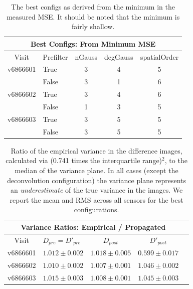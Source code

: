 \documentclass[prd, nofootinbib, floatfix, 11pt,tightenlines,times]{article}
\begin{document}
\clearpage

\begin{table}
\centering
\begin{tabular}{clccc}
\hline
\multicolumn{5}{|c|}{Best Configs: From Minimum MSE} \\
\hline
Visit    & Prefilter & nGauss & degGauss & spatialOrder \\
\hline
v6866601 & True      & 3      & 4        & 5 \\
         & False     & 3      & 1        & 6 \\
v6866602 & True      & 3      & 4        & 6 \\
         & False     & 1      & 3        & 5 \\
v6866603 & True      & 3      & 5        & 5 \\
         & False     & 3      & 5        & 5 \\
\end{tabular}
\caption{The best configs as derived from the minimum in the measured MSE.  It should 
be noted that the minimum is fairly shallow.
\label{tab-bestconfig_MSE}}
\end{table}

\clearpage

\begin{table}
\centering
\begin{tabular}{clccc}
\hline
\multicolumn{4}{|c|}{Variance Ratios: Empirical / Propagated} \\
\hline
Visit    & $D_{pre} = D'_{pre}$ & $D_{post}$ & $D'_{post}$ \\
\hline
v6866601 &$1.012 \pm 0.002$&$1.018 \pm 0.005$&$0.599 \pm 0.017$ \\
v6866602 &$1.010 \pm 0.002$&$1.007 \pm 0.001$&$1.046 \pm 0.002$ \\
v6866603 &$1.015 \pm 0.003$&$1.008 \pm 0.001$&$1.045 \pm 0.003$ \\
\end{tabular}
\caption{Ratio of the empirical variance in the difference images,
  calculated via (0.741 times the interquartile range)$^2$, to the
  median of the variance plane.  In all cases (except the deconvolution configuration) the variance plane
  represents an {\it underestimate} of the true variance in the
  images.  We report the mean and RMS across all sensors for the best
  configurations.  }
\label{tab-variance1}
\end{table}
\end{document}
